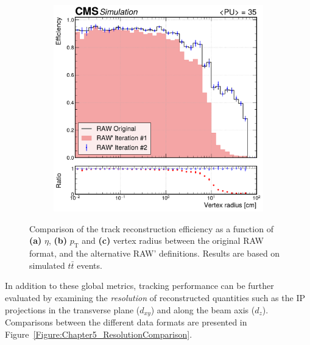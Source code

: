 \begin{figure}[!htbp]
        \begin{subfigure}{0.49\textwidth}
            \centering
            \includegraphics[width=\textwidth]{Figures/Chapter5/efficiency_comparison_2_vertpos.pdf}
            \caption{}
        \end{subfigure}
    \caption[Comparison of the track reconstruction efficiency as a function of $\eta$, $p_\mathrm{T}$, and vertex radius between the original RAW format, and the alternative RAW' definitions.]{Comparison of the track reconstruction efficiency as a function of \textbf{(a)} $\eta$, \textbf{(b)} $p_\mathrm{T}$ and \textbf{(c)} vertex radius between the original RAW format, and the alternative RAW' definitions. Results are based on simulated $t\bar{t}$ events.} 
    \label{Figure:Chapter5_TrackingPerformance_2}
\end{figure}

In addition to these global metrics, tracking performance can be further evaluated by
examining the \textit{resolution} of reconstructed quantities such as the \ac{IP} projections in the transverse plane ($d_{xy}$) and along the beam axis ($d_z$). Comparisons between the different data formats are presented in Figure~\ref{Figure:Chapter5_ResolutionComparison}.

